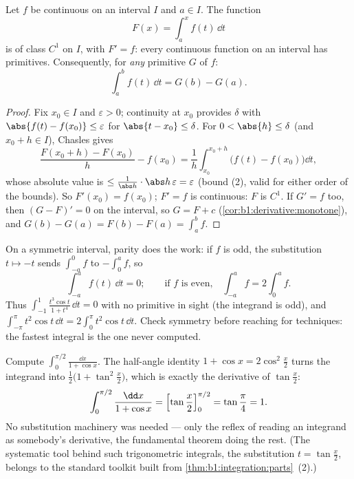 \begin{theorem}\label{thm:b1:integration:ftc}
Let $f$ be continuous on an interval $I$ and $a \in I$. The function
\[
F(x) = \int_a^x f(t)\, \dd t
\]
is of class $C^1$ on $I$, with $F' = f$: every continuous function
on an interval has primitives. Consequently, for \emph{any}
primitive $G$ of $f$:
\[
\int_a^b f(t)\,\dd t = G(b) - G(a) .
\]
\end{theorem}

\begin{proof}
Fix $x_0 \in I$ and $\varepsilon > 0$; continuity at $x_0$ provides
$\delta$ with $\abs{f(t) - f(x_0)} \leq \varepsilon$ for $\abs{t -
x_0} \leq \delta$. For $0 < \abs{h} \leq \delta$ (and $x_0 + h \in
I$), Chasles gives
\[
\frac{F(x_0 + h) - F(x_0)}{h} - f(x_0)
= \frac 1h \int_{x_0}^{x_0+h} \bigl(f(t) - f(x_0)\bigr)\dd t ,
\]
whose absolute value is $\leq \frac{1}{\abs h}\cdot \abs h\,
\varepsilon = \varepsilon$ (bound (2), valid for either order of the
bounds). So $F'(x_0) = f(x_0)$; $F' = f$ is continuous: $F$ is
$C^1$. If $G' = f$ too, then $(G - F)' = 0$ on the interval, so $G =
F + c$ (\cref{cor:b1:derivative:monotone}), and $G(b) - G(a) = F(b)
- F(a) = \int_a^b f$.
\end{proof}

\begin{example}\label{ex:b1:integration:parity}
On a symmetric interval, parity does the work: if $f$ is odd,
the substitution $t \mapsto -t$ sends $\int_{-a}^{0} f$ to
$-\int_0^a f$, so
\[
\int_{-a}^{a} f(t)\,\dd t = 0 ;
\qquad\text{if $f$ is even,}\quad
\int_{-a}^{a} f = 2\int_0^a f .
\]
Thus $\int_{-1}^{1} \frac{t^3\cos t}{1 + t^4}\,\dd t = 0$ with
no primitive in sight (the integrand is odd), and
$\int_{-\pi}^{\pi} t^2\cos t\,\dd t = 2\int_0^\pi t^2\cos t\,
\dd t$. Check symmetry before reaching for techniques: the
fastest integral is the one never computed.
\end{example}

\begin{example}\label{ex:b1:integration:halfangle}
Compute $\displaystyle\int_0^{\pi/2} \frac{\dd x}{1 + \cos x}$.
The half-angle identity $1 + \cos x = 2\cos^2\frac x2$ turns the
integrand into $\frac{1}{2}\bigl(1 + \tan^2\frac
x2\bigr)$, which is exactly the derivative of $\tan\frac x2$:
\[
\int_0^{\pi/2} \frac{\dd x}{1 + \cos x}
= \Bigl[\tan\frac x2\Bigr]_0^{\pi/2} = \tan\frac\pi4 = 1 .
\]
No substitution machinery was needed --- only the reflex of
reading an integrand as somebody's derivative, the fundamental
theorem doing the rest. (The systematic tool behind such
trigonometric integrals, the substitution $t = \tan\frac x2$,
belongs to the standard toolkit built from
\cref{thm:b1:integration:parts}~(2).)
\end{example}

